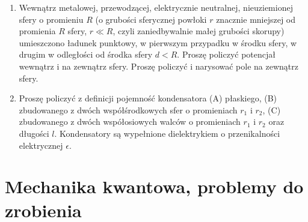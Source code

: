 \documentclass[a4paper,11pt]{article}
\begin{document}
\begin{enumerate}
\item Wewnątrz metalowej, przewodzącej, elektrycznie neutralnej,
  nieuziemionej sfery o promieniu $R$ (o grubości sferycznej powłoki
  $r$ znacznie mniejszej od promienia $R$ sfery, $r \ll R$, czyli
  zaniedbywalnie małej grubości skorupy) umieszczono ładunek punktowy,
  w pierwszym przypadku w środku sfery, w drugim w odległości od
  środka sfery $d < R$. Proszę policzyć potencjał wewnątrz i na
  zewnątrz sfery. Proszę policzyć i narysować pole na zewnątrz sfery.

\item Proszę policzyć z definicji pojemność kondensatora (A)
  płaskiego, (B) zbudowanego z dwóch współśrodkowych sfer o
  promieniach $r_{ 1 }$ i $r_{ 2 }$, (C) zbudowanego z dwóch
  współosiowych walców o promieniach $r_{ 1 }$ i $r_{ 2 }$ oraz
  długości $l$. Kondensatory są wypełnione dielektrykiem o
  przenikalności elektrycznej $\epsilon$.

\end{enumerate}










\section{Mechanika kwantowa, problemy do zrobienia}


\end{document}
